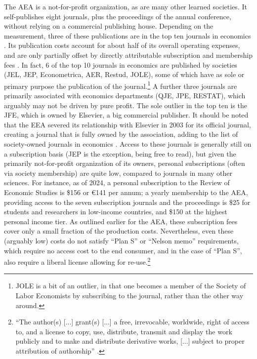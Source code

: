 \documentclass{article}
\begin{document}
The \ac{AEA} is a not-for-profit organization, as are many other learned societies. It self-publishes eight journals, plus the proceedings of the annual conference, without relying on a commercial publishing house. Depending on the measurement, three of these publications are in the top ten journals in economics \citep{mogstad_statistical_2022-1}. Its publication costs account for about half of its overall operating expenses, and are only partially offset by directly attributable subscription and membership fees \citep{cherry_bekaert_llp_american_2024}. In fact, 6 of the top 10 journals in economics \citep{mogstad_statistical_2022-1} are published by societies (JEL, JEP, Econometrica, AER, Restud, JOLE), some of which have as sole or primary purpose the publication of the journal.\footnote{JOLE is a bit of an outlier, in that one becomes a member of the Society of Labor Economists by subscribing to the journal, rather than the other way around.} A further three journals are primarily associated with economics departments (QJE, JPE, RESTAT), which arguably may not be driven by pure profit. The sole outlier in the top ten is the \ac{JFE}, which is owned by Elsevier, a big commercial publisher. It should be noted that the \ac{EEA} severed its relationship with Elsevier in 2003 for its official journal, creating a journal that is fully owned by the association, adding to the list of society-owned journals in economics \citep{tirole_editorial_2003}. Access to these journals is generally still on a subscription basis (JEP is the exception, being free to read), but given the primarily not-for-profit organization of its owners, personal subscriptions (often via society membership) are quite low, compared to journals in many other sciences. For instance, as of 2024, a personal subscription to the Review of Economic Studies is \$156 or €141 per annum; a yearly membership to the \ac{AEA}, providing access to the seven subscription journals and the proceedings is \$25 for students and researchers in low-income countries, and \$150 at the highest personal income tier. As outlined earlier for the AEA, these subscription fees cover only a small fraction of the production costs. Nevertheless, even these (arguably low) costs do not satisfy ``Plan S'' or ``Nelson memo'' requirements, which require no access cost to the end consumer, and in the case of ``Plan S'', also require a liberal license allowing for re-use.\footnote{``The author(s) [...] grant(s) [...] a free, irrevocable, worldwide, right of access to, and a license to copy, use, distribute, transmit and display the work publicly and to make and distribute derivative works, [...] subject to proper attribution of authorship'' \citep{max-planck-gesellschaft_berlin_2023}. }
\end{document}
